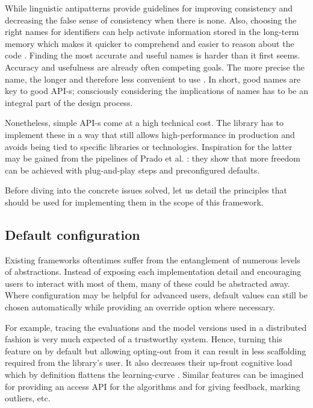 While linguistic antipatterns provide guidelines for improving consistency and decreasing the false sense of consistency when there is none. Also, choosing the right names for identifiers can help activate information stored in the long-term memory which makes it quicker to comprehend and easier to reason about the code \cite{deissenboeck2006concise}. Finding the most accurate and useful names is harder than it first seems. Accuracy and usefulness are already often competing goals. The more precise the name, the longer and therefore less convenient to use \cite{butler2009relating}. In short, good names are key to good API-s; consciously considering the implications of names has to be an integral part of the design process.

Nonetheless, simple API-s come at a high technical cost. The library has to implement these in a way that still allows high-performance in production \cite{kleppmann2017designing} and avoids being tied to specific libraries or technologies. Inspiration for the latter may be gained from the pipelines of Prado et al. \cite{prado2020bonseyes}: they show that more freedom can be achieved with plug-and-play steps and preconfigured defaults. 

Before diving into the concrete issues solved, let us detail the principles that should be used for implementing them in the scope of this framework.

\subsection{Default configuration}

Existing frameworks oftentimes suffer from the entanglement of numerous levels of abstractions. Instead of exposing each implementation detail and encouraging users to interact with most of them, many of these could be abstracted away. Where configuration may be helpful for advanced users, default values can still be chosen automatically while providing an override option where necessary.

For example, tracing the evaluations and the model versions used in a distributed fashion is very much expected of a trustworthy system. Hence, turning this feature on by default but allowing opting-out from it can result in less scaffolding required from the library's user. It also decreases their up-front cognitive load which by definition flattens the learning-curve \cite{hermans2021programmer}. Similar features can be imagined for providing an access API for the algorithms and for giving feedback, marking outliers, etc.

